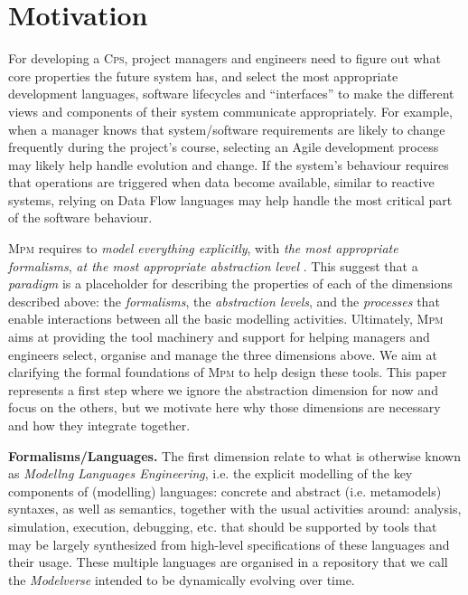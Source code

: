 \section{Motivation}
\label{sec:Motivation}

For developing a \textsc{Cps}, project managers and engineers need to figure 
out what core properties the future system has, and select the most 
appropriate development languages, software lifecycles and ``interfaces'' to 
make the different views and components of their system communicate 
appropriately. For example, when a manager knows that system/software 
requirements are likely to change frequently during the project's course, 
selecting an Agile development process may likely help handle evolution and 
change. If the system's behaviour requires that operations are triggered when 
data become available, similar to reactive systems, relying on Data Flow 
languages may help handle the most critical part of the software behaviour. 

\textsc{Mpm} requires to \emph{model everything explicitly}, with \emph{the 
most appropriate formalisms}, \emph{at the most appropriate abstraction level} 
\cite{PhD:VanTandeloo:2017}. This suggest that a \emph{paradigm} is a 
placeholder for describing the properties of each of the dimensions described 
above: the \emph{formalisms}, the \emph{abstraction levels}, and the 
\emph{processes} that enable interactions between all the basic modelling 
activities. Ultimately, \textsc{Mpm} aims at providing the tool machinery and 
support for helping managers and engineers select, organise and manage the 
three dimensions above. We aim at clarifying the formal foundations of 
\textsc{Mpm} to help design these tools. This paper represents a first step 
where we ignore the abstraction dimension for now and focus on the others, but 
we motivate here why those dimensions are necessary and how they integrate 
together.

\noindent
\textbf{Formalisms/Languages.} The first dimension relate to what is otherwise 
known as \emph{Modellng Languages Engineering}, i.e. the explicit modelling of 
the key components of (modelling) languages: concrete and abstract (i.e. 
metamodels) syntaxes, as well as semantics, together with the usual activities 
around: analysis, simulation, execution, debugging, etc. that should be 
supported by tools that may be largely synthesized from high-level 
specifications of these languages and their usage. These multiple languages are 
organised in a repository that we call the \emph{Modelverse} intended to be 
dynamically evolving over time.


